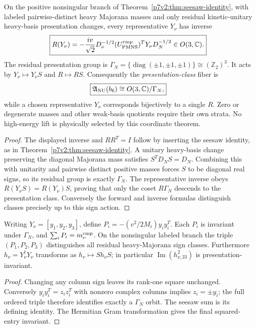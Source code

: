 \documentclass[11pt,a4paper]{article}
\begin{document}
\begin{corollary}
\label{p7v2:cor:casas-ibarra-fiber-coordinate}
On the positive nonsingular branch of
Theorem~\ref{p7v2:thm:seesaw-identity}, with labeled pairwise-distinct
heavy Majorana masses and only residual kinetic-unitary heavy-basis
presentation changes, every representative $Y_\nu$ has inverse
\[
 \boxed{R(Y_\nu)=-\frac{iv}{\sqrt2}
 D_\nu^{-1/2}(U_{\rm PMNS}^{\rm cmp})^T Y_\nu D_N^{-1/2}
 \in O(3,\mathbb C).}
\]
The residual presentation group is
$\Gamma_N=\{\operatorname{diag}(\pm1,\pm1,\pm1)\}\cong(\mathbb Z_2)^3$.
It acts by $Y_\nu\mapsto Y_\nu S$ and $R\mapsto RS$.
Consequently the \emph{presentation-class} fiber is
\[
 \boxed{\mathfrak A_{\rm NU}(b_6)\cong O(3,\mathbb C)/\Gamma_N,}
\]
while a chosen representative $Y_\nu$ corresponds bijectively to a
single $R$. Zero or degenerate masses and other weak-basis quotients
require their own strata. No high-energy lift is physically selected by
this coordinate theorem.
\end{corollary}
\begin{proof}
The displayed inverse and $RR^T=I$ follow by inserting the seesaw
identity, as in Theorem~\ref{p7v2:thm:seesaw-identity}.
A unitary heavy-basis change preserving the diagonal Majorana mass
satisfies $S^T D_NS=D_N$. Combining this with unitarity and pairwise
distinct positive masses forces $S$ to be diagonal real signs, so its
residual group is exactly $\Gamma_N$. The representative inverse obeys
$R(Y_\nu S)=R(Y_\nu)S$, proving that only the coset $R\Gamma_N$
descends to the presentation class. Conversely the forward and inverse
formulas distinguish classes precisely up to this sign action.
\end{proof}
\begin{proposition}
\label{p7v2:prop:v382-neutral-lift-rankone-quotient}
Writing $Y_\nu=[y_1,y_2,y_3]$, define
$P_i=-(v^2/2M_i)y_i y_i^T$. Each $P_i$ is invariant under
$\Gamma_N$, and $\sum_iP_i=m_\nu^{\rm cmp}$.
On the nonsingular labeled branch the triple $(P_1,P_2,P_3)$
distinguishes all residual heavy-Majorana sign classes.
Furthermore $h_\nu=Y_\nu^\dagger Y_\nu$ transforms as
$h_\nu\mapsto Sh_\nu S$; in particular
$\operatorname{Im}(h_{\nu,23}^2)$ is presentation-invariant.
\end{proposition}
\begin{proof}
Changing any column sign leaves its rank-one square unchanged.
Conversely $y_i y_i^T=z_i z_i^T$ with nonzero complex columns implies
$z_i=\pm y_i$; the full ordered triple therefore identifies exactly a
$\Gamma_N$ orbit. The seesaw sum is its defining identity.
The Hermitian Gram transformation gives the final squared-entry invariant.
\end{proof}
\end{document}
